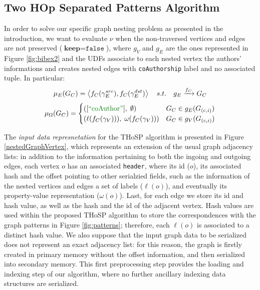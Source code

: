 \subsection{Two HOp Separated Patterns Algorithm}\label{sec:THOSPA}
In order to solve our specific graph nesting problem as presented in the introduction, we want to evaluate $\nu$ when the non-traversed vertices and edges are not preserved ($\textbf{keep}=\texttt{false}$), where $g_V$ and $g_E$ are the ones represented in Figure \ref{fig:bibex2} and the UDFs associate to each nested vertex the authors' informations and creates nested edges with \texttt{coAuthorship} label and no associated tuple. In particular:
\[\mu_E(G_C)=\Braket{f_C(\gamma_E^{src}),f_C(\gamma_E^{dst})}\quad s.t.\quad g_E\xrightarrow{f_C}G_C\]
\[\mu_\Omega(G_C)=\begin{cases}
([\mstr{coAuthor}],\;\emptyset) & G_C \in g_E(G_{(c,i)})\\
(\ell(f_C(\gamma_V))),\;\omega(f_C(\gamma_V))) & G_C \in g_V(G_{(c,i)})\\
\end{cases}\]


The \textit{input data  represnetation} for the THoSP algorithm is presented in Figure \ref{nestedGraphVertex}, which represents an  extension of the usual graph adjacency lists: in addition to the information pertaining to both the ingoing and outgoing edges, each vertex $o$ has an associated \texttt{header}, where its id ($o$), its associated hash and the offset pointing to other serialzied fields, such as the information of the  nested vertices and edges a set of labels ($\ell(o)$), and eventually its property-value representation ($\omega(o)$). Last, for each edge we store its id and hash value, as well as the hash and the id of the adjacent vertex. Hash values are used within the proposed THoSP algorithm to store the correspondences with the graph patterns in Figure \ref{fig:patterns}; therefore, each $\ell(o)$ is associated to a distinct hash value. We also suppose that the input graph data to be serialized does not represent an exact adjacency list: for this reason, the graph is firstly created in primary memory without the offset information, and then serialized into secondary memory. This first preprocessing step provides the loading and indexing step of our algorithm, where no further ancillary indexing data structures are serialized.









